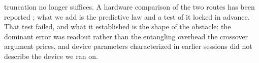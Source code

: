 %
%

truncation no longer suffices. A
hardware comparison of the two routes has been reported
\cite{peng2025beyond}; what we add is the predictive law and a test of it
locked in advance. That test failed, and what it established is the shape
of the obstacle: the dominant error was readout rather than the entangling
overhead the crossover argument prices, and device parameters
characterized in earlier sessions did not describe the device we ran on.
